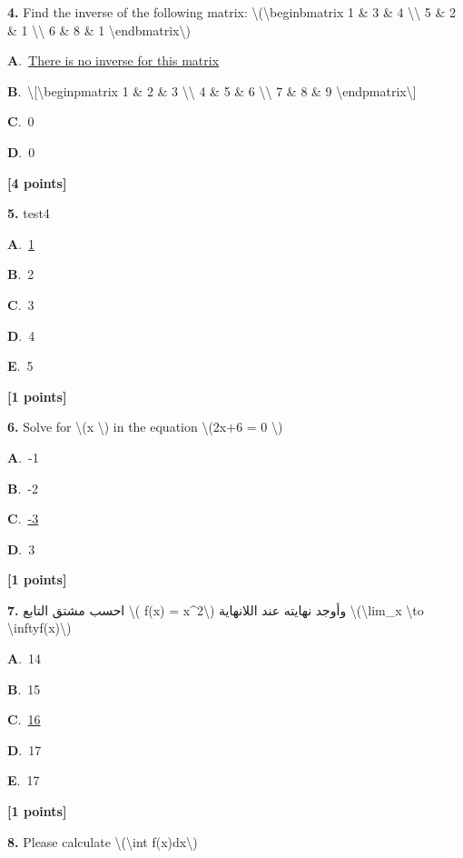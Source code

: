 \documentclass[12pt]{article}
\newcommand{\choice}[3]{%
  \noindent\textbf{#1}.~#2\hfill#3\par\vspace{0.25em}
}
\begin{document}
\noindent \textbf{\textenglish{4.}} {\textenglish{Find the inverse of the following matrix: \textbackslash{}(\textbackslash{}begin{bmatrix} 1 \& 3 \& 4 \textbackslash{}\textbackslash{} 5 \& 2 \& 1 \textbackslash{}\textbackslash{} 6 \& 8 \& 1 \textbackslash{}end{bmatrix}\textbackslash{})}}

\noindent\choice{A}{\underline{{\textenglish{There is no inverse for this matrix}}}}{}
\noindent\choice{B}{{\textenglish{\textbackslash{}[\textbackslash{}begin{pmatrix} 1 \& 2 \& 3 \textbackslash{}\textbackslash{} 4 \& 5 \& 6 \textbackslash{}\textbackslash{} 7 \& 8 \& 9  \textbackslash{}end{pmatrix}\textbackslash{}]}}}{}
\noindent\choice{C}{{\textenglish{0}}}{}
\noindent\choice{D}{{\textenglish{0}}}{}
\hfill \textbf{[4 points]}\vspace{0.5em}

\noindent \textbf{\textenglish{5.}} {\textenglish{test4}}

\noindent\choice{A}{\underline{{\textenglish{1}}}}{}
\noindent\choice{B}{{\textenglish{2}}}{}
\noindent\choice{C}{{\textenglish{3}}}{}
\noindent\choice{D}{{\textenglish{4}}}{}
\noindent\choice{E}{{\textenglish{5}}}{}
\hfill \textbf{[1 points]}\vspace{0.5em}

\noindent \textbf{\textenglish{6.}} {\textenglish{Solve for \textbackslash{}(x \textbackslash{}) in the equation \textbackslash{}(2x+6 = 0 \textbackslash{})}}

\noindent\choice{A}{{\textenglish{-1}}}{}
\noindent\choice{B}{{\textenglish{-2}}}{}
\noindent\choice{C}{\underline{{\textenglish{-3}}}}{}
\noindent\choice{D}{{\textenglish{3}}}{}
\hfill \textbf{[1 points]}\vspace{0.5em}

\noindent \textbf{\textenglish{7.}} {\textarabic{احسب مشتق التابع \textbackslash{}( f(x) = x\^{}2\textbackslash{}) وأوجد نهايته عند اللانهاية \textbackslash{}(\textbackslash{}lim\_{x \textbackslash{}to \textbackslash{}infty}f(x)\textbackslash{})}}

\noindent\choice{A}{{\textenglish{14}}}{}
\noindent\choice{B}{{\textenglish{15}}}{}
\noindent\choice{C}{\underline{{\textenglish{16}}}}{}
\noindent\choice{D}{{\textenglish{17}}}{}
\noindent\choice{E}{{\textenglish{17}}}{}
\hfill \textbf{[1 points]}\vspace{0.5em}

\noindent \textbf{\textenglish{8.}} {\textenglish{Please calculate \textbackslash{}(\textbackslash{}int f(x)dx\textbackslash{})}}
\end{document}
